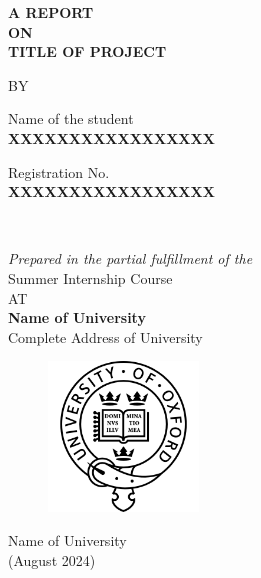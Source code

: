 \documentclass[12pt]{report}
\begin{document}
\begin{center}
{\Large \textbf{A REPORT}}\\
\bigskip
{\Large \textbf{ON}}\\
\bigskip
{\Large \textbf{TITLE OF PROJECT}}\\
\vspace{0.5cm}

\large{BY}\\

\vspace{1cm}

\begin{minipage}{.5\textwidth}
        \raggedright
    \begin{center}
        Name of the student\\
    \textbf{XXXXXXXXXXXXXXXXX}\\
    \end{center}
\end{minipage}%
\begin{minipage}{0.5\textwidth}
    \raggedleft
    \begin{center}
        Registration No.\\
    \textbf{XXXXXXXXXXXXXXXXX}\\
    \end{center}
\end{minipage}\\

\vspace{1cm}

\textit{\large{Prepared in the partial fulfillment of the}} \\
{\large{Summer Internship Course}} \\
\bigskip
\large{AT}\\
\bigskip
\textbf{Name of University} \\
\large{Complete Address of University} \\

\end{center}


\begin{center}
\begin{figure}[H]
    \centering
    \includegraphics[width=40mm]{university-of-oxford-badge-logo.png}
    \label{fig:oxford logo}
\end{figure}
\Large{Name of University}\\
{(August 2024)}\\
\end{center}
\end{document}
